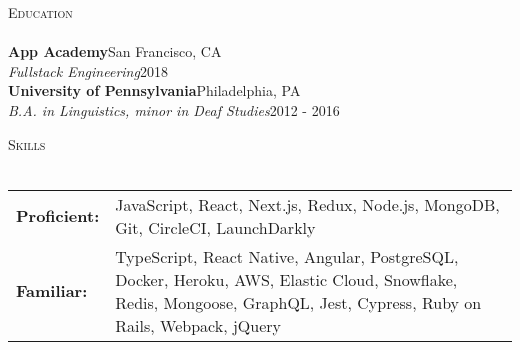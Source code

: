 \documentclass[a4paper]{article}
\newcommand{\header}[1]{
    {\hspace*{-18pt}\vspace*{3pt} \textcolor{deeppurple}{\textsc{#1}}}
    \vspace*{-12pt} \\
    \hspace*{-18pt} \textcolor{deeppurple}{\hrulefill} \\
}
\begin{document}
\header{Education}
\textbf{App Academy}\hfill San Francisco, CA\\
\textit{Fullstack Engineering}\hfill 2018\\
\vspace{2mm}
\textbf{University of Pennsylvania}\hfill Philadelphia, PA\\
\textit{B.A. in Linguistics, minor in Deaf Studies}\hfill 2012 - 2016\\
\vspace{2mm}

\header{Skills}
\vspace{1mm}
\begin{tabular}{ l p{5.4in} }
    \hspace{-0.08in}\textbf{Proficient:} & JavaScript, React, Next.js, Redux, Node.js, MongoDB, Git, CircleCI, LaunchDarkly \\
    \hspace{-0.08in}\textbf{Familiar:}   & TypeScript, React Native, Angular, PostgreSQL, Docker, Heroku, AWS, Elastic Cloud, Snowflake, Redis, Mongoose, GraphQL, Jest, Cypress, Ruby on Rails, Webpack, jQuery \\
\end{tabular}
\end{document}
